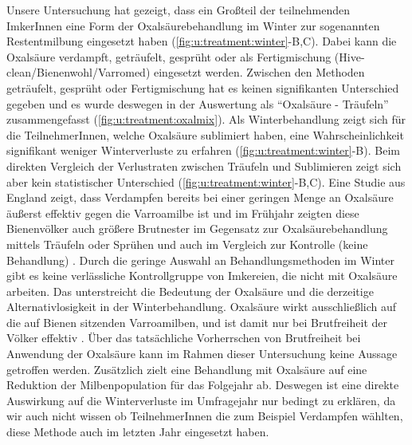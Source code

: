
Unsere Untersuchung hat gezeigt, dass ein Großteil der teilnehmenden ImkerInnen eine Form der Oxalsäurebehandlung im Winter zur sogenannten Restentmilbung eingesetzt haben (\cref{fig:u:treatment:winter}-B,C). Dabei kann die Oxalsäure verdampft, geträufelt, gesprüht oder als Fertigmischung (Hive-clean/Bienenwohl/Varromed) eingesetzt werden. Zwischen den Methoden geträufelt, gesprüht oder Fertigmischung hat es keinen signifikanten Unterschied gegeben und es wurde deswegen in der Auswertung als \enquote{Oxalsäure - Träufeln} zusammengefasst (\cref{fig:u:treatment:oxalmix}).
\newline
Als Winterbehandlung zeigt sich für die TeilnehmerInnen, welche Oxalsäure sublimiert haben, eine Wahrscheinlichkeit signifikant weniger Winterverluste zu erfahren (\cref{fig:u:treatment:winter}-B). Beim direkten Vergleich der Verlustraten zwischen Träufeln und Sublimieren zeigt sich aber kein statistischer Unterschied (\cref{fig:u:treatment:winter}-B,C). Eine Studie aus England zeigt, dass Verdampfen bereits bei einer geringen Menge an Oxalsäure äußerst effektiv gegen die Varroamilbe ist und im Frühjahr zeigten diese Bienenvölker auch größere Brutnester im Gegensatz zur Oxalsäurebehandlung mittels Träufeln oder Sprühen und auch im Vergleich zur Kontrolle (keine Behandlung) \citep{altoufailia2015}.
\newline
Durch die geringe Auswahl an Behandlungsmethoden im Winter gibt es keine verlässliche Kontrollgruppe von Imkereien, die nicht mit Oxalsäure arbeiten. Das unterstreicht die Bedeutung der Oxalsäure und die derzeitige Alternativlosigkeit in der Winterbehandlung. Oxalsäure wirkt ausschließlich auf die auf Bienen sitzenden Varroamilben, und ist damit nur bei Brutfreiheit der Völker effektiv \citep{rosenkranz2010}. Über das tatsächliche Vorherrschen von Brutfreiheit bei Anwendung der Oxalsäure kann im Rahmen dieser Untersuchung keine Aussage getroffen werden. Zusätzlich zielt eine Behandlung mit Oxalsäure auf eine Reduktion der Milbenpopulation für das Folgejahr ab. Deswegen ist eine direkte Auswirkung auf die Winterverluste im Umfragejahr nur bedingt zu erklären, da wir auch nicht wissen ob TeilnehmerInnen die zum Beispiel  Verdampfen wählten, diese Methode auch im letzten Jahr eingesetzt haben.


